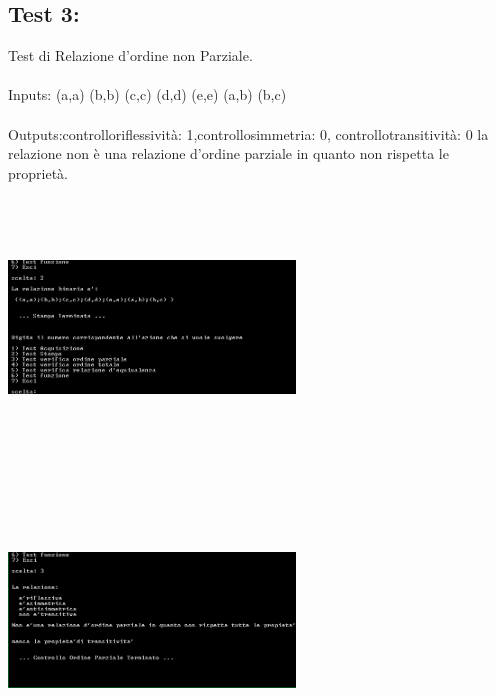 \documentclass[11pt, a4paper, titlepage, block]{article}
\begin{document}
	\subsection{Test 3:} 
	Test di Relazione d'ordine non Parziale.\\
	\\
	Inputs: (a,a) (b,b) (c,c) (d,d) (e,e) (a,b) (b,c) \\
	\\
	Outputs:controlloriflessivit\`a: 1,controllosimmetria: 0, controllotransitivit\`a: 0
	la relazione non \`e una relazione d'ordine parziale in quanto non rispetta le propriet\`a.\\
	\includegraphics[width=3in,height=3in,viewport=0 0 300 300]{../Screenshots/Test3Input.png}
	\\
	\includegraphics[width=3in,height=3in,viewport=0 0 300 300]{../Screenshots/Test3Output.png}
	\\
	\\
	\newpage
\end{document}
